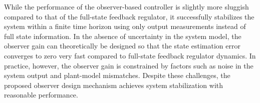 While the performance of the observer-based controller is slightly more sluggish compared to that of the full-state feedback regulator, it successfully stabilizes the system within a finite time horizon using only output measurements instead of full state information. In the absence of uncertainty in the system model, the observer gain can theoretically be designed so that the state estimation error converges to zero very fast compared to full-state feedback regulator dynamics. In practice, however, the observer gain is constrained by factors such as noise in the system output and plant-model mismatches. Despite these challenges, the proposed observer design mechanism achieves system stabilization with reasonable performance.